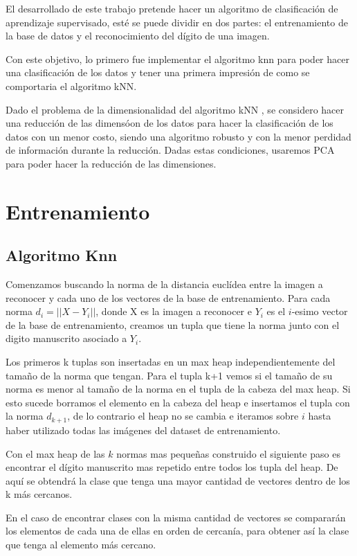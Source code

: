 El desarrollado de este trabajo pretende hacer un algoritmo de clasificación de aprendizaje supervisado, esté se puede dividir en dos partes: el entrenamiento de la base de datos y el reconocimiento del dígito de una imagen. \par 
\indent Con este objetivo, lo primero fue implementar el algoritmo knn para poder hacer una clasificación de los datos y tener una primera impresión de como se comportaria el algoritmo kNN. \par
\indent Dado el problema de la dimensionalidad del algoritmo kNN , se considero hacer una reducción de las dimensóon de los datos para hacer la clasificación de los datos con un menor costo, siendo una algoritmo robusto y con la menor perdidad de información durante la reducción. Dadas estas condiciones, usaremos PCA para poder hacer la reducción de las dimensiones. \par


\section{Entrenamiento}

\subsection{Algoritmo Knn}
Comenzamos buscando la norma de la distancia euclídea entre la imagen a reconocer y cada uno de los vectores de la base de entrenamiento. Para cada norma $d_{i}=||X-Y_{i}||$, donde X es la imagen a reconocer e $Y_{i}$ es el $i$-esimo vector de la base de entrenamiento, creamos un tupla que tiene la norma junto con el digito manuscrito asociado a $Y_{i}$.\par
\indent Los primeros k tuplas son insertadas en un max heap independientemente del tamaño de la norma que tengan. Para el tupla k+1 vemos si el tamaño de su norma es menor al tamaño de la norma en el tupla de la cabeza del max heap. Si esto sucede borramos el elemento en la cabeza del heap e insertamos el tupla con la norma $d_{k+1}$, de lo contrario el heap no se cambia e iteramos sobre $i$ hasta haber utilizado todas las imágenes del dataset de entrenamiento. \par
\indent Con el max heap de las $k$ normas mas pequeñas construido el siguiente paso es encontrar el dígito manuscrito mas repetido entre todos los tupla del heap. De aquí se obtendrá la clase que tenga una mayor cantidad de vectores dentro de los k más cercanos.\par
\indent En el caso de encontrar clases con la misma cantidad de vectores se compararán los elementos de cada una de ellas en orden de cercanía, para obtener así la clase que tenga al elemento más cercano.\par

